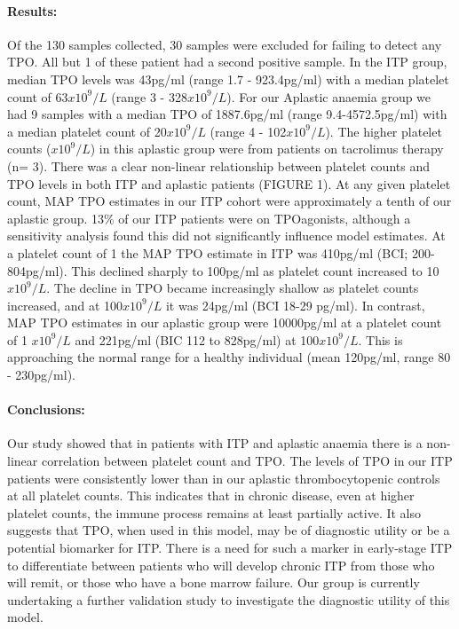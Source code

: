 \documentclass[11pt]{article}
\begin{document}
\paragraph{Results:} Of the 130 samples collected, 30 samples were excluded for failing to detect any TPO. All but 1 of these patient had a second positive sample. In the ITP group, median TPO levels was 43pg/ml (range 1.7 - 923.4pg/ml) with a median platelet count of 63$x10^9/L$ (range 3 - 328$x10^9/L$). For our Aplastic anaemia group we had 9 samples with a median TPO of 1887.6pg/ml (range 9.4-4572.5pg/ml) with a median platelet count of 20$x10^9/L$ (range 4 - 102$x10^9/L$). The higher platelet counts ($x10^9/L$) in this aplastic group were from patients on tacrolimus therapy (n= 3). There was a clear non-linear relationship between platelet counts and TPO levels in both ITP and aplastic patients (FIGURE 1). At any given platelet count, MAP TPO estimates in our ITP cohort were approximately a tenth of our aplastic group. 13\% of our ITP patients were on TPOagonists, although a sensitivity analysis found this did not significantly influence model estimates. At a platelet count of 1 the MAP TPO estimate in ITP was 410pg/ml (BCI; 200-804pg/ml). This declined sharply to 100pg/ml as platelet count increased to 10$x10^9/L$. The decline in TPO became increasingly shallow as platelet counts increased, and at 100$x10^9/L$ it was 24pg/ml (BCI 18-29 pg/ml). In contrast, MAP TPO estimates in our aplastic group were \geqslant10000pg/ml at a platelet count of 1 $x10^9/L$ and 221pg/ml (BIC 112 to 828pg/ml) at 100$x10^9/L$. This is approaching the normal range for a healthy individual (mean 120pg/ml, range 80 - 230pg/ml).



\paragraph{Conclusions:} Our study showed that in patients with ITP and aplastic anaemia there is a non-linear correlation between platelet count and TPO. The levels of TPO in our ITP patients were consistently lower than in our aplastic thrombocytopenic controls at all platelet counts. This indicates that in chronic disease, even at higher platelet counts, the immune process remains at least partially active. It also suggests that TPO, when used in this model, may be of diagnostic utility or be a potential biomarker for ITP. There is a need for such a marker in early-stage ITP to differentiate between patients who will develop chronic ITP from those who will remit, or those who have a bone marrow failure. Our group is currently undertaking a further validation study to investigate the diagnostic utility of this model.
\end{document}
